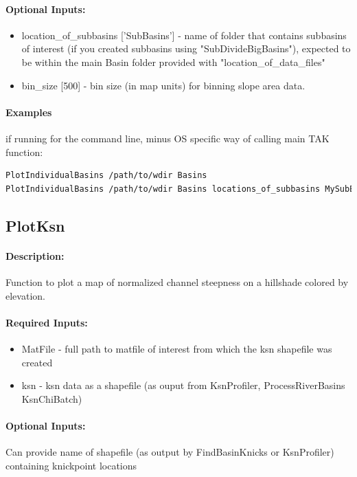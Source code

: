 \paragraph{Optional Inputs:}
\begin{itemize}
\item location\_of\_subbasins ['SubBasins'] - name of folder that contains subbasins of interest (if you created subbasins using
"SubDivideBigBasins"), expected to be within the main Basin folder provided with "location\_of\_data\_files"
\item bin\_size [500] - bin size (in map units) for binning slope area data.
\end{itemize}

\paragraph{Examples} if running for the command line, minus OS specific way of calling main TAK function:
\begin{lstlisting}[language=bash]
PlotIndividualBasins /path/to/wdir Basins
PlotIndividualBasins /path/to/wdir Basins locations_of_subbasins MySubBasins
\end{lstlisting}

\subsection{PlotKsn}
\paragraph{Description:}
Function to plot a map of normalized channel steepness on a hillshade colored
by elevation.

\paragraph{Required Inputs:}
\begin{itemize}
\item MatFile - full path to matfile of interest from which the ksn shapefile was created
\item ksn - ksn data as a shapefile (as ouput from KsnProfiler, ProcessRiverBasins
KsnChiBatch)
\end{itemize}

\paragraph{Optional Inputs:}
Can provide name of shapefile (as output by FindBasinKnicks or KsnProfiler) containing knickpoint locations 

